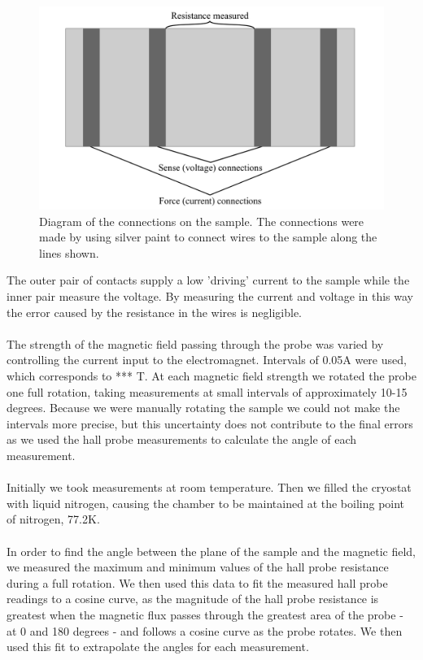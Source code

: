 \documentclass[10pt, twocolumn]{revtex4}
\begin{document}
\begin{figure}[H]
	\centering
	\includegraphics[width = \columnwidth]{drawing-1.png}
	\caption{Diagram of the connections on the sample. The connections were made by using silver paint to connect wires to the sample along the lines shown.}
	\label{fig:setup2}
\end{figure}

The outer pair of contacts supply a low 'driving' current to the sample while the inner pair measure the voltage. By measuring the current and voltage in this way the error caused by the resistance in the wires is negligible.\\ %
\\
The strength of the magnetic field passing through the probe was varied by controlling the current input to the electromagnet. Intervals of 0.05A were used, which corresponds to *** T. At each magnetic field strength we rotated the probe one full rotation, taking measurements at small intervals of approximately 10-15 degrees. Because we were manually rotating the sample we could not make the intervals more precise, but this uncertainty does not contribute to the final errors as we used the hall probe measurements to calculate the angle of each measurement. \\
\\
Initially we took measurements at room temperature. Then we filled the cryostat with liquid nitrogen, causing the chamber to be maintained at the boiling point of nitrogen, 77.2K.\\ %
\\
In order to find the angle between the plane of the sample and the magnetic field, we measured the maximum and minimum values of the hall probe resistance during a full rotation. We then used this data to fit the measured hall probe readings to a cosine curve, as the magnitude of the hall probe resistance is greatest when the magnetic flux passes through the greatest area of the probe - at 0 and 180 degrees - and follows a cosine curve as the probe rotates. We then used this fit to extrapolate the angles for each measurement.
\end{document}
